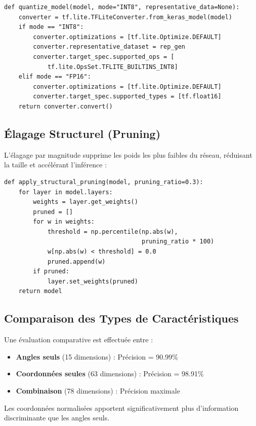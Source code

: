 \begin{lstlisting}[style=python, caption={Quantification TFLite}]
def quantize_model(model, mode="INT8", representative_data=None):
    converter = tf.lite.TFLiteConverter.from_keras_model(model)
    if mode == "INT8":
        converter.optimizations = [tf.lite.Optimize.DEFAULT]
        converter.representative_dataset = rep_gen
        converter.target_spec.supported_ops = [
            tf.lite.OpsSet.TFLITE_BUILTINS_INT8]
    elif mode == "FP16":
        converter.optimizations = [tf.lite.Optimize.DEFAULT]
        converter.target_spec.supported_types = [tf.float16]
    return converter.convert()
\end{lstlisting}

\subsection{Élagage Structurel (Pruning)}

L'élagage par magnitude supprime les poids les plus faibles du réseau, réduisant la taille et accélérant l'inférence :

\begin{lstlisting}[style=python, caption={Élagage par magnitude}]
def apply_structural_pruning(model, pruning_ratio=0.3):
    for layer in model.layers:
        weights = layer.get_weights()
        pruned = []
        for w in weights:
            threshold = np.percentile(np.abs(w),
                                      pruning_ratio * 100)
            w[np.abs(w) < threshold] = 0.0
            pruned.append(w)
        if pruned:
            layer.set_weights(pruned)
    return model
\end{lstlisting}

\subsection{Comparaison des Types de Caractéristiques}

Une évaluation comparative est effectuée entre :
\begin{itemize}
    \item \textbf{Angles seuls} (15 dimensions) : Précision = 90.99\%
    \item \textbf{Coordonnées seules} (63 dimensions) : Précision = 98.91\%
    \item \textbf{Combinaison} (78 dimensions) : Précision maximale
\end{itemize}

Les coordonnées normalisées apportent significativement plus d'information discriminante que les angles seuls.


